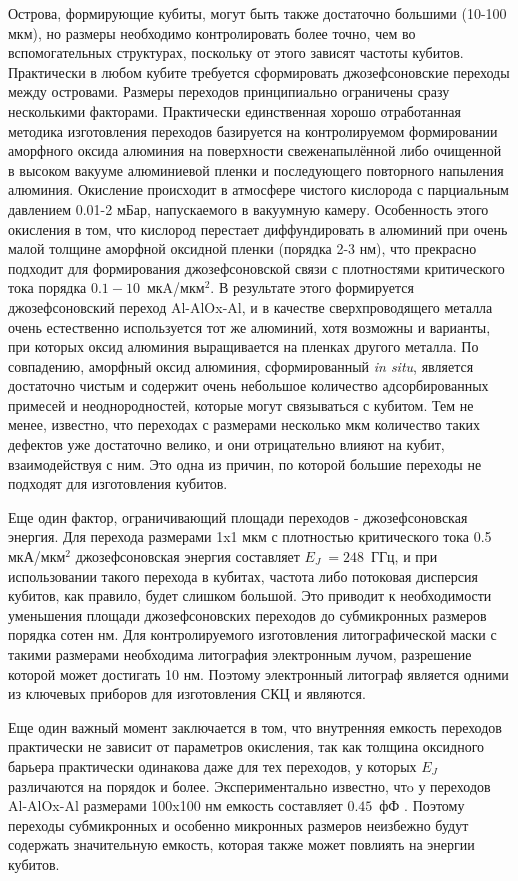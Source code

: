 Острова, формирующие кубиты, могут быть также достаточно большими (10-100 мкм), но размеры необходимо контролировать более точно, чем во вспомогательных структурах, поскольку от этого зависят частоты кубитов. Практически в любом кубите требуется сформировать джозефсоновские переходы между островами. Размеры переходов принципиально ограничены сразу несколькими факторами. Практически единственная хорошо отработанная методика изготовления переходов базируется на контролируемом формировании аморфного оксида алюминия на поверхности свеженапылённой либо очищенной в высоком вакууме алюминиевой пленки и последующего повторного напыления алюминия. Окисление происходит в атмосфере чистого кислорода с парциальным давлением 0.01-2 мБар, напускаемого в вакуумную камеру. Особенность этого окисления в том, что кислород перестает диффундировать в алюминий при очень малой толщине аморфной оксидной пленки (порядка 2-3 нм), что прекрасно подходит для формирования джозефсоновской связи с плотностями критического тока порядка $0.1-10$~мкA/мкм$^2$. В результате этого формируется джозефсоновский переход Al-AlOx-Al, и в качестве сверхпроводящего металла очень естественно используется тот же алюминий, хотя возможны и варианты, при которых оксид алюминия выращивается на пленках другого металла. По совпадению, аморфный оксид алюминия, сформированный \textit{in situ}, является достаточно чистым и содержит очень небольшое количество адсорбированных примесей и неоднородностей, которые могут связываться с кубитом. Тем не менее, известно, что переходах с размерами несколько мкм количество таких дефектов уже достаточно велико, и они отрицательно влияют на кубит, взаимодействуя с ним. Это одна из причин, по которой большие переходы не подходят для изготовления кубитов. 

Еще один фактор, ограничивающий площади переходов - джозефсоновская энергия. Для перехода размерами 1x1 мкм с плотностью критического тока 0.5 мкА/мкм$^2$ джозефсоновская энергия составляет $E_J\:=248$~ГГц, и при использовании такого перехода в кубитах, частота либо потоковая дисперсия кубитов, как правило, будет слишком большой. Это приводит к необходимости уменьшения площади джозефсоновских переходов до субмикронных размеров порядка сотен нм. Для контролируемого изготовления литографической маски с такими размерами необходима литография электронным лучом, разрешение которой может достигать 10 нм. Поэтому электронный литограф является одними из ключевых приборов для изготовления СКЦ и являются. 

Еще один важный момент заключается в том, что внутренняя емкость переходов практически не зависит от параметров окисления, так как толщина оксидного барьера практически одинакова даже для тех переходов, у которых $E_J$ различаются на порядок и более. Экспериментально известно, чтo у переходов Al-AlOx-Al размерами 100x100 нм емкость составляет $0.45$~фФ \cite{JJ_capacitance}. Поэтому переходы субмикронных и особенно микронных размеров неизбежно будут содержать значительную емкость, которая также может повлиять на энергии кубитов.
 

